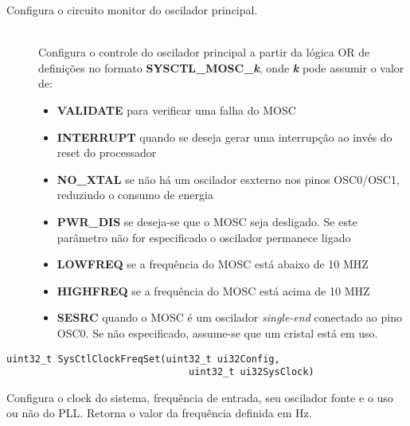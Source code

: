 Configura o circuito monitor do oscilador principal.

\begin{description}
	\item []\hfill \\
	Configura o controle do oscilador principal a partir da lógica OR de definições no formato \textbf{SYSCTL\_MOSC\_\emph{k}}, onde \textbf{\emph{k}} pode assumir o valor de:
	\begin{itemize}
		\item \textbf{VALIDATE} para verificar uma falha do MOSC
		\item \textbf{INTERRUPT} quando se deseja gerar uma interrupção ao invés do reset do processador
		\item \textbf{NO\_XTAL} se não há um oscilador esxterno nos pinos OSC0/OSC1, reduzindo o consumo de energia
		\item \textbf{PWR\_DIS} se deseja-se que o MOSC seja desligado. Se este parâmetro não for especificado o oscilador permanece ligado
		\item \textbf{LOWFREQ} se a frequência do MOSC está abaixo de 10 MHZ
		\item \textbf{HIGHFREQ} se a frequência do MOSC está acima de 10 MHZ
		\item \textbf{SESRC} quando o MOSC é um oscilador \emph{single-end} conectado ao pino OSC0. Se não especificado, assume-se que um cristal está em uso.
	\end{itemize}

\end{description}


\begin{lstlisting}[style=funcao]
	uint32_t SysCtlClockFreqSet(uint32_t ui32Config,
								uint32_t ui32SysClock)
\end{lstlisting}

Configura o clock do sistema, frequência de entrada, seu oscilador fonte e o uso ou não do PLL. Retorna o valor da frequência definida em Hz.

